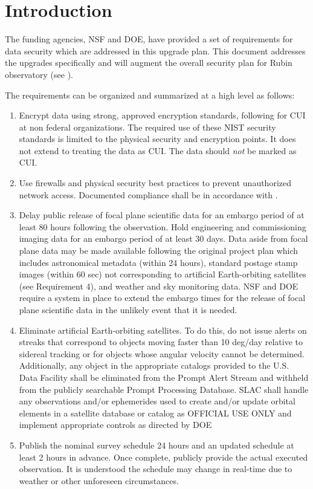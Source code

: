 \section{Introduction}

The funding agencies, NSF and DOE,  have provided a set of requirements for data security which are addressed in this upgrade plan.  This document addresses the upgrades specifically and will augment the overall security plan for Rubin observatory (see ).

The requirements can be organized and summarized at a high level as follows:
\begin{enumerate}

\item	Encrypt data using strong, approved encryption standards,  following  for \gls{CUI} at non federal organizations. The required use of these \gls{NIST} security standards is limited to the physical security and encryption points. It does not extend to treating the data as \gls{CUI}. The data should \emph{not} be marked as \gls{CUI}.
\item	Use firewalls and physical security best practices to prevent unauthorized network  access. Documented compliance shall be in accordance with .
\item	Delay public release of  focal plane scientific data for an embargo period of at least 80 hours following the  observation.
Hold engineering and commissioning imaging data for an embargo period of at least 30 days.
Data aside from focal plane data may be made available following the original project plan which includes astronomical metadata (within 24 hours), standard postage stamp images (within 60 sec) not corresponding to artificial  Earth-orbiting satellites (see Requirement 4), and weather and sky monitoring data.
NSF and DOE require a system in  place to extend the embargo times for the release of focal plane scientific data in the unlikely event that it is needed.

\item	Eliminate artificial Earth-orbiting satellites.
To do this, do not issue alerts on streaks that correspond to objects  moving faster than 10 deg/day relative to sidereal tracking or for objects whose angular velocity cannot be determined.
Additionally, any object in the appropriate catalogs provided to the U.S. Data Facility shall be eliminated from the  Prompt Alert Stream and withheld from the publicly searchable Prompt Processing Database.
SLAC shall handle any  observations and/or ephemerides used to create and/or update orbital elements in a satellite database or catalog as  OFFICIAL USE ONLY and implement appropriate controls as directed by DOE
\item	Publish the nominal survey schedule 24 hours and an updated schedule at least 2 hours in advance.
Once complete, publicly provide the actual executed observation.
It is understood the schedule may change in real-time due to  weather or other unforeseen circumstances.


\end{enumerate}

